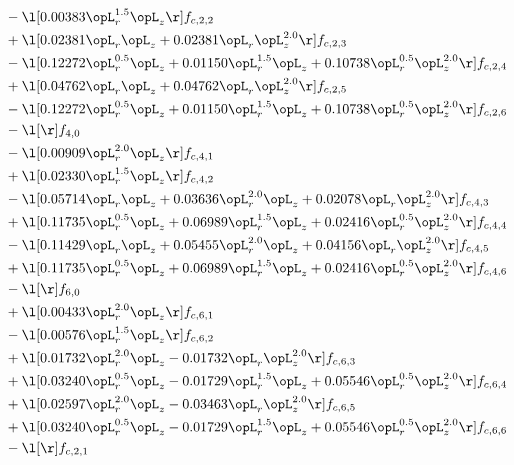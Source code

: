 \begin{alignat}{2}
& - \l[  0.00383 \opL_r^{1.5} \opL_z  \r] f_{c,2,2} \nonumber \\ 
& + \l[  0.02381 \opL_r \opL_z +  0.02381 \opL_r \opL_z^{2.0}  \r] f_{c,2,3} \nonumber \\ 
& - \l[  0.12272 \opL_r^{0.5} \opL_z +  0.01150 \opL_r^{1.5} \opL_z +  0.10738 \opL_r^{0.5} \opL_z^{2.0}  \r] f_{c,2,4} \nonumber \\ 
& + \l[  0.04762 \opL_r \opL_z +  0.04762 \opL_r \opL_z^{2.0}  \r] f_{c,2,5} \nonumber \\ 
& - \l[  0.12272 \opL_r^{0.5} \opL_z +  0.01150 \opL_r^{1.5} \opL_z +  0.10738 \opL_r^{0.5} \opL_z^{2.0}  \r] f_{c,2,6} \nonumber \\ 
& - \l[  \r] f_{4,0} \nonumber \\ 
& - \l[  0.00909 \opL_r^{2.0} \opL_z  \r] f_{c,4,1} \nonumber \\ 
& + \l[  0.02330 \opL_r^{1.5} \opL_z  \r] f_{c,4,2} \nonumber \\ 
& - \l[  0.05714 \opL_r \opL_z +  0.03636 \opL_r^{2.0} \opL_z +  0.02078 \opL_r \opL_z^{2.0}  \r] f_{c,4,3} \nonumber \\ 
& + \l[  0.11735 \opL_r^{0.5} \opL_z +  0.06989 \opL_r^{1.5} \opL_z +  0.02416 \opL_r^{0.5} \opL_z^{2.0}  \r] f_{c,4,4} \nonumber \\ 
& - \l[  0.11429 \opL_r \opL_z +  0.05455 \opL_r^{2.0} \opL_z +  0.04156 \opL_r \opL_z^{2.0}  \r] f_{c,4,5} \nonumber \\ 
& + \l[  0.11735 \opL_r^{0.5} \opL_z +  0.06989 \opL_r^{1.5} \opL_z +  0.02416 \opL_r^{0.5} \opL_z^{2.0}  \r] f_{c,4,6} \nonumber \\ 
& - \l[  \r] f_{6,0} \nonumber \\ 
& + \l[  0.00433 \opL_r^{2.0} \opL_z  \r] f_{c,6,1} \nonumber \\ 
& - \l[  0.00576 \opL_r^{1.5} \opL_z  \r] f_{c,6,2} \nonumber \\ 
& + \l[  0.01732 \opL_r^{2.0} \opL_z   -0.01732 \opL_r \opL_z^{2.0}  \r] f_{c,6,3} \nonumber \\ 
& + \l[  0.03240 \opL_r^{0.5} \opL_z   -0.01729 \opL_r^{1.5} \opL_z +  0.05546 \opL_r^{0.5} \opL_z^{2.0}  \r] f_{c,6,4} \nonumber \\ 
& + \l[  0.02597 \opL_r^{2.0} \opL_z   -0.03463 \opL_r \opL_z^{2.0}  \r] f_{c,6,5} \nonumber \\ 
& + \l[  0.03240 \opL_r^{0.5} \opL_z   -0.01729 \opL_r^{1.5} \opL_z +  0.05546 \opL_r^{0.5} \opL_z^{2.0}  \r] f_{c,6,6} \nonumber \\ 
& - \l[  \r] f_{c,2,1} \nonumber \\ 
\end{alignat} 


